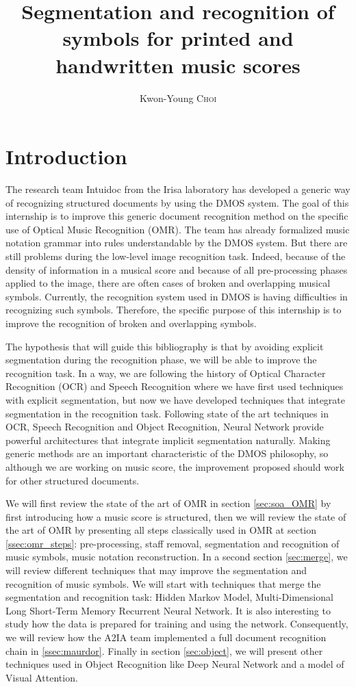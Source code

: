 \documentclass[11pt]{sdm}
\title{Segmentation and recognition of symbols for printed and handwritten music scores}
\author{Kwon-Young \textsc{Choi}}
\begin{document}
\maketitle


\section{Introduction}

The research team Intuidoc from the Irisa laboratory has developed a generic way of recognizing structured documents by using the DMOS system.
The goal of this internship is to improve this generic document recognition method on the specific use of Optical Music Recognition (OMR).
The team has already formalized music notation grammar into rules understandable by the DMOS system.
But there are still problems during the low-level image recognition task.
Indeed, because of the density of information in a musical score and because of all pre-processing phases applied to the image, there are often cases of broken and overlapping musical symbols.
Currently, the recognition system used in DMOS is having difficulties in recognizing such symbols.
Therefore, the specific purpose of this internship is to improve the recognition of broken and overlapping symbols.

The hypothesis that will guide this bibliography is that by avoiding explicit segmentation during the recognition phase, we will be able to improve the recognition task.
In a way, we are following the history of Optical Character Recognition (OCR) and Speech Recognition where we have first used techniques with explicit segmentation, but now we have developed techniques that integrate segmentation in the recognition task.
Following state of the art techniques in OCR, Speech Recognition and Object Recognition, Neural Network provide powerful architectures that integrate implicit segmentation naturally.
Making generic methods are an important characteristic of the DMOS philosophy, so although we are working on music score, the improvement proposed should work for other structured documents.

We will first review the state of the art of OMR in section \ref{sec:soa_OMR} by first introducing how a music score is structured, then we will review the state of the art of OMR by presenting all steps classically used in OMR at section \ref{ssec:omr_steps}: pre-processing, staff removal, segmentation and recognition of music symbols, music notation reconstruction.
In a second section \ref{sec:merge}, we will review different techniques that may improve the segmentation and recognition of music symbols.
We will start with techniques that merge the segmentation and recognition task: Hidden Markov Model, Multi-Dimensional Long Short-Term Memory Recurrent Neural Network.
It is also interesting to study how the data is prepared for training and using the network.
Consequently, we will review how the A2IA team implemented a full document recognition chain in \ref{ssec:maurdor}.
Finally in section \ref{sec:object}, we will present other techniques used in Object Recognition like Deep Neural Network and a model of Visual Attention.
\end{document}
